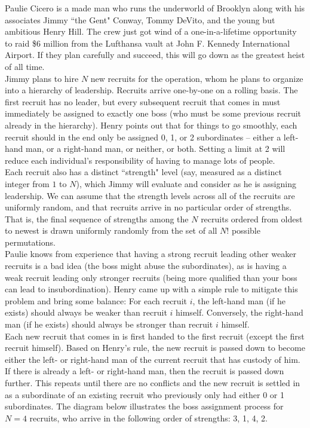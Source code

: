 
\noindent Paulie Cicero is a made man who runs the underworld of Brooklyn along with his associates Jimmy ``the Gent" Conway, Tommy DeVito, and the young but ambitious Henry Hill. The crew just got wind of a one-in-a-lifetime opportunity to raid \$6 million from the Lufthansa vault at John F. Kennedy International Airport. If they plan carefully and succeed, this will go down as the greatest heist of all time.\\

Jimmy plans to hire $N$ new recruits for the operation, whom he plans to organize into a hierarchy of leadership. Recruits arrive one-by-one on a rolling basis. The first recruit has no leader, but every subsequent recruit that comes in must immediately be assigned to exactly one boss (who must be some previous recruit already in the hierarchy). Henry points out that for things to go smoothly, each recruit should in the end only be assigned 0, 1, or 2 subordinates -- either a left-hand man, or a right-hand man, or neither, or both. Setting a limit at 2 will reduce each individual's responsibility of having to manage lots of people.\\

Each recruit also has a distinct ``strength" level (say, measured as a distinct integer from $1$ to $N$), which Jimmy will evaluate and consider as he is assigning leadership. We can assume that the strength levels across all of the recruits are uniformly random, and that recruits arrive in no particular order of strengths. That is, the final sequence of strengths among the $N$ recruits ordered from oldest to newest is drawn uniformly randomly from the set of all $N!$ possible permutations.\\

Paulie knows from experience that having a strong recruit leading other weaker recruits is a bad idea (the boss might abuse the subordinates), as is having a weak recruit leading only stronger recruits (being more qualified than your boss can lead to insubordination). Henry came up with a simple rule to mitigate this problem and bring some balance: For each recruit $i$, the left-hand man (if he exists) should always be weaker than recruit $i$ himself. Conversely, the right-hand man (if he exists) should always be stronger than recruit $i$ himself.\\

Each new recruit that comes in is first handed to the first recruit (except the first recruit himself). Based on Henry's rule, the new recruit is passed down to become either the left- or right-hand man of the current recruit that has custody of him. If there is already a left- or right-hand man, then the recruit is passed down further. This repeats until there are no conflicts and the new recruit is settled in as a subordinate of an existing recruit who previously only had either 0 or 1 subordinates. The diagram below illustrates the boss assignment process for $N = 4$ recruits, who arrive in the following order of strengths: 3, 1, 4, 2.\\

